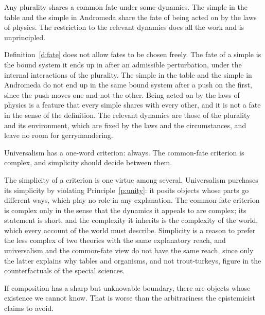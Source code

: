 \documentclass{situationist-preprint}
\begin{document}
\begin{objection}
Any plurality shares a common fate under some dynamics. The simple in the table and the simple in Andromeda share the fate of being acted on by the laws of physics. The restriction to the relevant dynamics does all the work and is unprincipled.
\end{objection}

\begin{reply}
Definition~\ref{d:fate} does not allow fates to be chosen freely. The fate of a simple is the bound system it ends up in after an admissible perturbation, under the internal interactions of the plurality. The simple in the table and the simple in Andromeda do not end up in the same bound system after a push on the first, since the push moves one and not the other. Being acted on by the laws of physics is a feature that every simple shares with every other, and it is not a fate in the sense of the definition. The relevant dynamics are those of the plurality and its environment, which are fixed by the laws and the circumstances, and leave no room for gerrymandering.
\end{reply}

\begin{objection}
Universalism has a one-word criterion: always. The common-fate criterion is complex, and simplicity should decide between them.
\end{objection}

\begin{reply}
The simplicity of a criterion is one virtue among several. Universalism purchases its simplicity by violating Principle~\ref{p:unity}: it posits objects whose parts go different ways, which play no role in any explanation. The common-fate criterion is complex only in the sense that the dynamics it appeals to are complex; its statement is short, and the complexity it inherits is the complexity of the world, which every account of the world must describe. Simplicity is a reason to prefer the less complex of two theories with the same explanatory reach, and universalism and the common-fate view do not have the same reach, since only the latter explains why tables and organisms, and not trout-turkeys, figure in the counterfactuals of the special sciences.
\end{reply}

\begin{objection}
If composition has a sharp but unknowable boundary, there are objects whose existence we cannot know. That is worse than the arbitrariness the epistemicist claims to avoid.
\end{objection}
\end{document}
